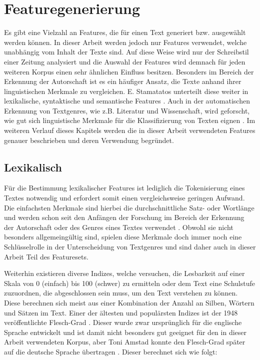 \section{Featuregenerierung}\label{features}
Es gibt eine Vielzahl an Features, die für einen Text generiert bzw. ausgewählt werden können. In dieser Arbeit werden jedoch nur Features verwendet, welche unabhängig vom Inhalt der Texte sind. Auf diese Weise wird nur der Schreibstil einer Zeitung analysiert und die Auswahl der Features wird demnach für jeden weiteren Korpus einen sehr ähnlichen Einfluss besitzen. Besonders im Bereich der Erkennung der Autorschaft ist es ein häufiger Ansatz, die Texte anhand ihrer linguistischen Merkmale zu vergleichen. E. Stamatatos unterteilt diese weiter in lexikalische, syntaktische und semantische Features \cite{stamatatos2009survey}. Auch in der automatischen Erkennung von Textgenres, wie z.B. Literatur und Wissenschaft, wird geforscht, wie gut sich linguistische Merkmale für die Klassifizierung von Texten eignen \cite{cimino2017identifying}. Im weiteren Verlauf dieses Kapitels werden die in dieser Arbeit verwendeten Features genauer beschrieben und deren Verwendung begründet.

\subsection{Lexikalisch}
Für die Bestimmung lexikalischer Features ist lediglich die Tokenisierung eines Textes notwendig und erfordert somit einen vergleichsweise geringen Aufwand. Die einfachsten Merkmale sind hierbei die durchschnittliche Satz- oder Wortlänge und werden schon seit den Anfängen der Forschung im Bereich der Erkennung der Autorschaft oder des Genres eines Textes verwendet \cite[S.~473]{stamatatos2000automatic}. Obwohl sie nicht besonders allgemeingültig sind, spielen diese Merkmale doch immer noch eine Schlüsselrolle in der Unterscheidung von Textgenres \cite{cimino2017identifying} und sind daher auch in dieser Arbeit Teil des Featuresets.

Weiterhin existieren diverse Indizes, welche versuchen, die Lesbarkeit auf einer Skala von 0 (einfach) bis 100 (schwer) zu ermitteln oder dem Text eine Schulstufe zuzuordnen, die abgeschlossen sein muss, um den Text verstehen zu können. Diese berechnen sich meist aus einer Kombination der Anzahl an Silben, Wörtern und Sätzen im Text. Einer der ältesten und populärsten Indizes ist der 1948 veröffentlichte Flesch-Grad \cite{mccallum1982computer}. Dieser wurde zwar ursprünglich für die englische Sprache entwickelt und ist damit nicht besonders gut geeignet für den in dieser Arbeit verwendeten Korpus, aber Toni Amstad konnte den Flesch-Grad später auf die deutsche Sprache übertragen \cite{amstad1978verstandlich}. Dieser berechnet sich wie folgt:


